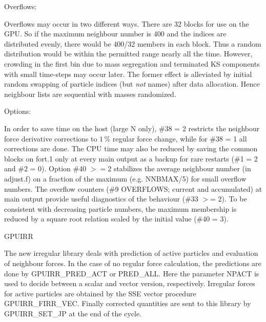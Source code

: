 \documentclass[12pt]{article}
\begin{document}
\medskip
\medskip
\noindent
Overflows:

\medskip
Overflows may occur in two different ways.
There are 32 blocks for use on the GPU.
So if the maximum neighbour number is 400 and the indices are
distributed evenly, there would be 400/32 members in each block.
Thus a random distribution
would be within the permitted range nearly all the time.
However, crowding in the first bin due to mass segregation and
terminated KS components with small time-steps may occur later.
The former effect is alleviated by initial random swapping of particle
indices (but {\it not} names) after data allocation.
Hence neighbour lists are sequential with masses randomized.

\medskip
\medskip
\noindent
Options:

\medskip
In order to save time on the host (large N only), \#38 = 2 restricts the
neighbour force derivative corrections to $1 \,\%$ regular force change,
while for \#38 = 1 all corrections are done.
The CPU time may also be reduced by saving the common blocks on fort.1
only at every main output as a backup for rare restarts (\#1 = 2 and \#2 = 0).
Option \#40 $>= 2$ stabilizes the average neighbour number (in adjust.f)
on a fraction of the maximum (e.g. NNBMAX/5) for small overflow numbers.
The overflow counters (\#9 OVERFLOWS; current and accumulated) at main
output provide useful diagnostics of the behaviour (\#33 $>$= 2).
To be consistent with decreasing particle numbers, the maximum membership
is reduced by a square root relation scaled by the initial value (\#40 = 3).

\medskip
\medskip
\noindent
GPUIRR

\medskip
The new irregular library deals with prediction of active particles and
evaluation of neighbour forces.
In the case of no regular force calculation,
the predictions are done by GPUIRR\_PRED\_ACT or PRED\_ALL.
Here the parameter NPACT is used to decide between a scalar and vector
version, respectively.
Irregular forces for active particles are obtained by the SSE vector
procedure GPUIRR\_FIRR\_VEC.
Finally corrected quantities are sent to this library by GPUIRR\_SET\_JP
at the end of the cycle.
\end{document}
